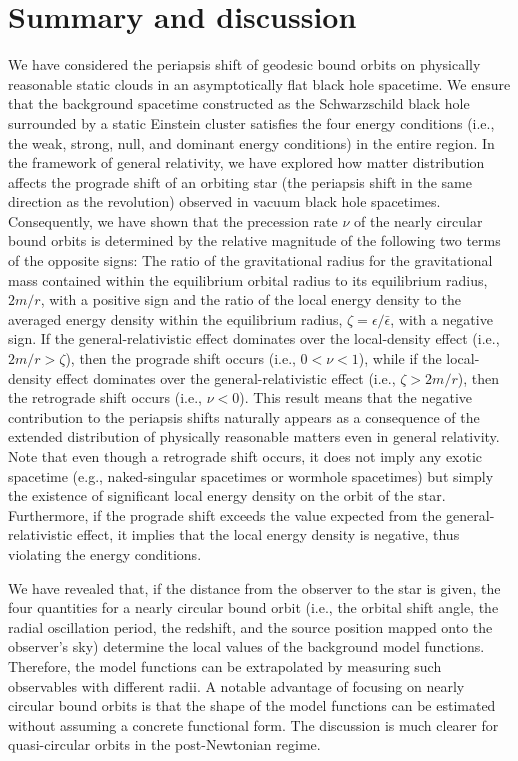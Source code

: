 \documentclass[aps,11pt,nofootinbib,preprintnumbers,groupedaddress,superscriptaddress]{revtex4-2}
\begin{document}
\section{Summary and discussion}
\label{sec:6}
We have considered 
the periapsis shift of 
geodesic bound orbits on physically reasonable static clouds in an asymptotically flat black hole spacetime. 
We ensure that the background 
spacetime constructed as the Schwarzschild black hole surrounded by a static Einstein cluster 
satisfies the four energy conditions (i.e., the weak, strong, null, and dominant energy conditions) in the entire region.
In the framework of general relativity, we have explored how 
matter distribution 
affects the prograde shift of an orbiting star (the 
periapsis shift in the same direction as the revolution) observed in vacuum black hole spacetimes.
Consequently,
we have shown that 
the precession rate $\nu$ of the nearly circular 
bound orbits
is determined by the relative magnitude of the following 
two terms of the opposite signs: 
The ratio of the gravitational radius for the 
gravitational mass 
contained within the equilibrium orbital radius to its equilibrium radius, $2m/r$, 
with a positive sign and the ratio of the local 
energy density to the averaged 
energy density within the equilibrium radius, 
$\zeta=\epsilon/\bar{\epsilon}$, 
with a negative sign. 
If the general-relativistic 
effect dominates over the 
local-density 
effect (i.e., $2m/r>\zeta$), 
then the prograde shift occurs (i.e., $0<\nu<1$),
while 
if the 
local-density 
effect dominates over the 
general-relativistic 
effect (i.e., $\zeta>2m/r$), 
then the retrograde shift occurs (i.e., $\nu<0$). 
This result means that 
the negative contribution to the 
periapsis 
shifts naturally appears as a consequence of the extended distribution of physically reasonable matters even in general relativity. 
Note that even though a retrograde shift occurs, 
it does not imply any exotic spacetime (e.g., naked-singular spacetimes or wormhole spacetimes) but simply the existence of significant local energy density on the orbit of the star. 
Furthermore, if
the prograde shift exceeds the value expected from the general-relativistic effect, it implies that the local energy density is negative, thus violating the energy conditions. 


We have revealed that, 
if the distance from the observer to the star is given,
the four 
quantities
for a nearly circular 
bound orbit (i.e., the orbital shift angle, the radial oscillation period, the redshift, and the source position mapped onto the observer's sky) determine the local values of the background model functions. 
Therefore, the model functions can be extrapolated by measuring such observables with different radii. A notable advantage of focusing on nearly circular 
bound 
orbits is that the shape of the model functions can be estimated 
without 
assuming a concrete
functional form.
The discussion is much clearer for quasi-circular orbits in the post-Newtonian regime. 
\end{document}
